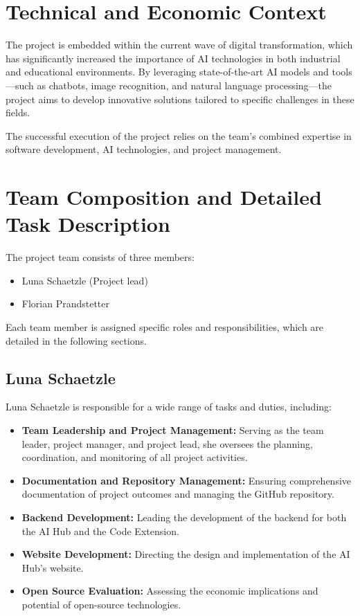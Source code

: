 \section{Technical and Economic Context}

The project is embedded within the current wave of digital transformation, which has significantly increased the importance of AI technologies in both industrial and educational environments. By leveraging state-of-the-art AI models and tools—such as chatbots, image recognition, and natural language processing—the project aims to develop innovative solutions tailored to specific challenges in these fields.

The successful execution of the project relies on the team’s combined expertise in software development, AI technologies, and project management.

\section{Team Composition and Detailed Task Description}

The project team consists of three members:
\begin{itemize}
    \item Luna Schaetzle (Project lead)
    \item Florian Prandstetter
\end{itemize}

Each team member is assigned specific roles and responsibilities, which are detailed in the following sections.

\subsection{Luna Schaetzle}

Luna Schaetzle is responsible for a wide range of tasks and duties, including:
\begin{itemize}
    \item \textbf{Team Leadership and Project Management:} Serving as the team leader, project manager, and project lead, she oversees the planning, coordination, and monitoring of all project activities.
    \item \textbf{Documentation and Repository Management:} Ensuring comprehensive documentation of project outcomes and managing the GitHub repository.
    \item \textbf{Backend Development:} Leading the development of the backend for both the AI Hub and the Code Extension.
    \item \textbf{Website Development:} Directing the design and implementation of the AI Hub's website.
    \item \textbf{Open Source Evaluation:} Assessing the economic implications and potential of open-source technologies.
\end{itemize}

